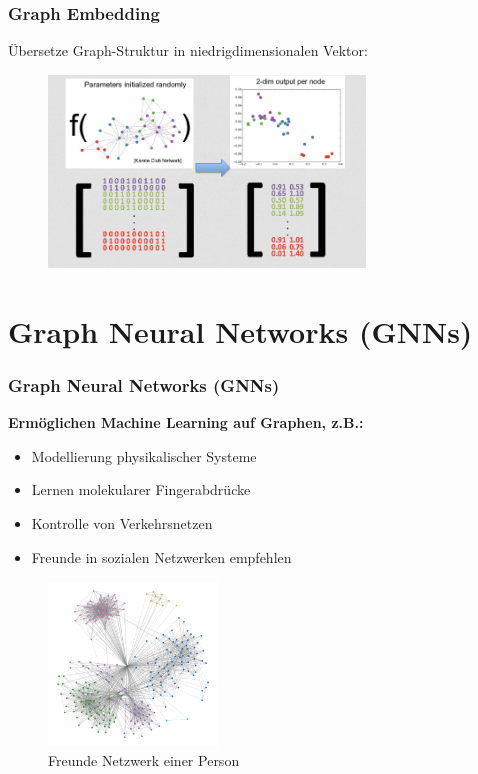 \documentclass{beamer}
\begin{document}
\begin{frame}
  \frametitle{Graph Embedding}
  Übersetze Graph-Struktur in niedrigdimensionalen Vektor:
  \begin{figure}
    \centering
    \includegraphics[width=0.75\textwidth]{img/graph_embedding.png}
    \caption*{ \cite{}}
  \end{figure}
\end{frame}

\section{Graph Neural Networks (GNNs)}

\begin{frame}
  \frametitle{Graph Neural Networks (GNNs)}
  \textbf{Ermöglichen Machine Learning auf Graphen, z.B.:}
  \begin{itemize}
    \item Modellierung physikalischer Systeme
    \item Lernen molekularer Fingerabdrücke
    \item Kontrolle von Verkehrsnetzen
    \item Freunde in sozialen Netzwerken empfehlen
  \end{itemize}
  \begin{figure}
    \centering
    \includegraphics[width=0.4\textwidth]{img/social_graph.png}
    \caption*{Freunde Netzwerk einer Person \cite{Facebook}}
  \end{figure}
\end{frame}
\end{document}
